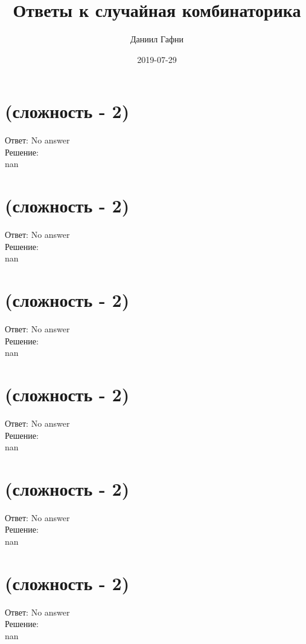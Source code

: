 \documentclass{article}%
\title{Ответы к случайная комбинаторика}%
\author{Даниил Гафни}%
\date{2019{-}07{-}29}%
\begin{document}
%
\normalsize%
\maketitle%
\section{(сложность {-} 2)}%
\label{sec:( {-} 2)}%
\hspace{3ex} Ответ: No answer \\%
%
\hspace*{3ex} Решение: \\%
nan

%
\section{(сложность {-} 2)}%
\label{sec:( {-} 2)}%
\hspace{3ex} Ответ: No answer \\%
%
\hspace*{3ex} Решение: \\%
nan

%
\section{(сложность {-} 2)}%
\label{sec:( {-} 2)}%
\hspace{3ex} Ответ: No answer \\%
%
\hspace*{3ex} Решение: \\%
nan

%
\section{(сложность {-} 2)}%
\label{sec:( {-} 2)}%
\hspace{3ex} Ответ: No answer \\%
%
\hspace*{3ex} Решение: \\%
nan

%
\section{(сложность {-} 2)}%
\label{sec:( {-} 2)}%
\hspace{3ex} Ответ: No answer \\%
%
\hspace*{3ex} Решение: \\%
nan

%
\section{(сложность {-} 2)}%
\label{sec:( {-} 2)}%
\hspace{3ex} Ответ: No answer \\%
%
\hspace*{3ex} Решение: \\%
nan
\end{document}
